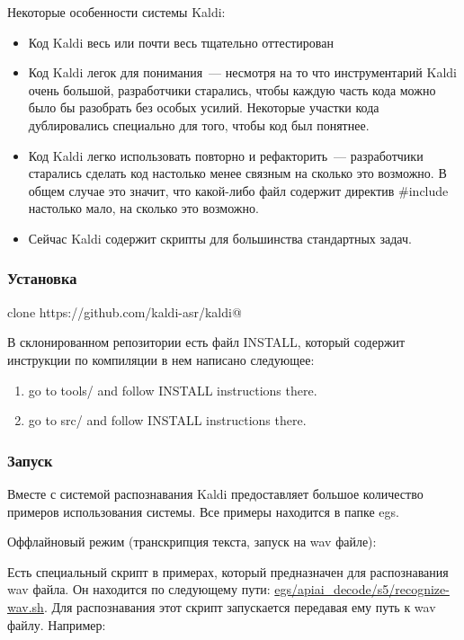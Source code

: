 \documentclass[10pt, a5paper]{article}
\begin{document}
Некоторые особенности системы Kaldi:

\begin{itemize}
  \item Код Kaldi весь или почти весь тщательно оттестирован
  \item Код Kaldi легок для понимания~--- несмотря на то что инструментарий Kaldi очень большой, разработчики старались, чтобы каждую часть кода можно было бы разобрать без особых усилий. Некоторые участки кода дублировались специально для того, чтобы код был понятнее.
  \item Код Kaldi легко использовать повторно и рефакторить~--- разработчики старались сделать код настолько менее связным на сколько это возможно. В общем случае это значит, что какой-либо файл содержит директив \#include настолько мало, на сколько это возможно.
  \item Сейчас Kaldi содержит скрипты для большинства стандартных задач.
\end{itemize}

\subsubsection*{Установка}

\verb@Git clone https://github.com/kaldi-asr/kaldi@

В склонированном репозитории есть файл INSTALL, который содержит инструкции по компиляции в нем написано следующее:

\begin{enumerate}
  \item go to tools/  and follow INSTALL instructions there.
  \item go to src/ and follow INSTALL instructions there.
\end{enumerate}

\subsubsection*{Запуск}

Вместе с системой распознавания Kaldi предоставляет большое количество примеров использования системы. Все примеры находится в папке egs.

Оффлайновый режим (транскрипция текста, запуск на wav файле):

Есть специальный скрипт в примерах, который предназначен для распознавания wav файла. Он находится по следующему пути: \url{egs/apiai\_decode/s5/recognize-wav.sh}. Для распознавания этот скрипт запускается передавая ему путь к wav файлу. Например:
\end{document}
